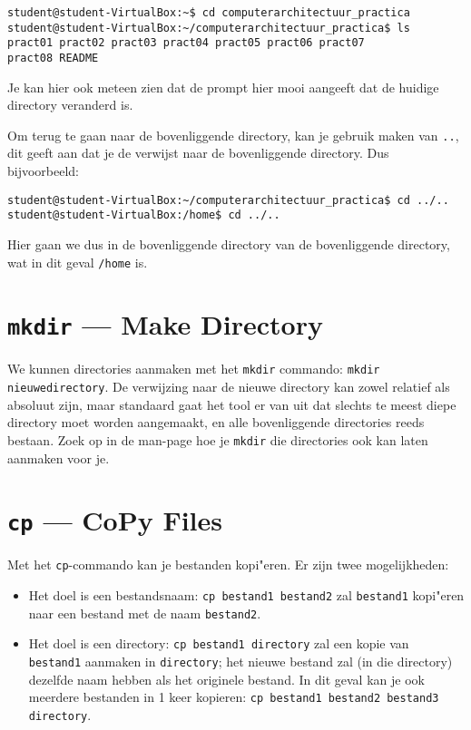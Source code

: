 \documentclass[a4paper,twoside,openany]{memoir}
\begin{document}
\begin{verbatim}
student@student-VirtualBox:~$ cd computerarchitectuur_practica
student@student-VirtualBox:~/computerarchitectuur_practica$ ls
pract01 pract02 pract03 pract04 pract05 pract06 pract07
pract08 README
\end{verbatim}

Je kan hier ook meteen zien dat de prompt hier mooi aangeeft dat de huidige directory veranderd is.

Om terug te gaan naar de bovenliggende directory, kan je gebruik maken van \verb!..!, dit geeft aan dat je de verwijst naar de bovenliggende directory. Dus bijvoorbeeld:
\begin{verbatim}
student@student-VirtualBox:~/computerarchitectuur_practica$ cd ../..
student@student-VirtualBox:/home$ cd ../..
\end{verbatim}

Hier gaan we dus in de bovenliggende directory van de bovenliggende directory, wat in dit geval \verb!/home! is.

\section{\texttt{mkdir} --- Make Directory}

We kunnen directories aanmaken met het \verb!mkdir! commando: \verb!mkdir nieuwedirectory!. De verwijzing naar de nieuwe directory kan zowel relatief als absoluut zijn, maar standaard gaat het tool er van uit dat slechts te meest diepe directory moet worden aangemaakt, en alle bovenliggende directories reeds bestaan. Zoek op in de man-page hoe je \verb!mkdir! die directories ook kan laten aanmaken voor je.

\section{\texttt{cp} --- CoPy Files}

Met het \verb!cp!-commando kan je bestanden kopi"eren. Er zijn twee mogelijkheden:

\begin{itemize}
\item Het doel is een bestandsnaam: \verb!cp bestand1 bestand2! zal \verb!bestand1! kopi"eren naar een bestand met de naam \verb!bestand2!.
\item Het doel is een directory: \verb!cp bestand1 directory! zal een kopie van \verb!bestand1! aanmaken in \verb!directory!; het nieuwe bestand zal (in die directory) dezelfde naam hebben als het originele bestand. In dit geval kan je ook meerdere bestanden in 1 keer kopieren: \verb!cp bestand1 bestand2 bestand3 directory!.
\end{itemize}
\end{document}
